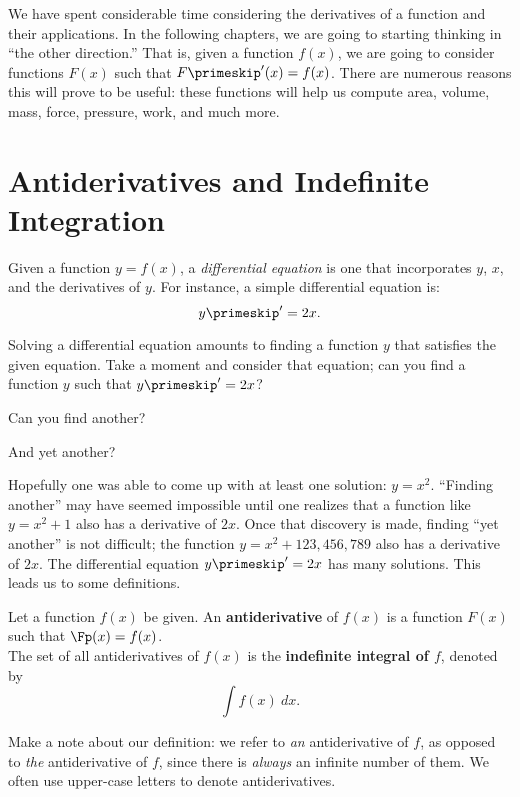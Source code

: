 We have spent considerable time considering the derivatives of a function and their applications. In the following chapters, we are going to starting thinking in ``the other direction.'' That is, given a function $f(x)$, we are going to consider functions $F(x)$ such that $F\primeskip'(x) = f(x)$. There are numerous reasons this will prove to be useful: these functions will help us compute area, volume, mass, force, pressure, work, and much more.



\section{Antiderivatives and Indefinite Integration}\label{sec:antider}

Given a function $y=f(x)$, a \textit{differential equation} is one that incorporates $y$, $x$, and the derivatives of $y$. For instance, a simple differential equation is: $$y\primeskip' = 2x.$$

Solving a differential equation amounts to finding a function $y$ that satisfies the given equation. Take a moment and consider that equation; can you find a function $y$ such that $y\primeskip' = 2x$?

Can you find another?

And yet another?

Hopefully one was able to come up with at least one solution: $y = x^2$. ``Finding another'' may have seemed impossible until one realizes that a function like $y=x^2+1$ also has a derivative of $2x$. Once that discovery is made, finding ``yet another'' is not difficult; the function $y = x^2 + 123,456,789$ also has a derivative of $2x$. The differential equation $y\primeskip' = 2x$ has many solutions. This leads us to some definitions.

{Let a function $f(x)$ be given. An \textbf{antiderivative} of $f(x)$ is a function $F(x)$ such that $\Fp(x) = f(x)$.\\

The set of all antiderivatives of $f(x)$ is the \textbf{indefinite integral of $f$}, denoted by $$\int f(x) \ dx.$$
}

Make a note about our definition: we refer to \textit{an} antiderivative of $f$, as opposed to \textit{the} antiderivative of $f$, since there is \textit{always} an infinite number of them. We often use upper-case letters to denote antiderivatives.

